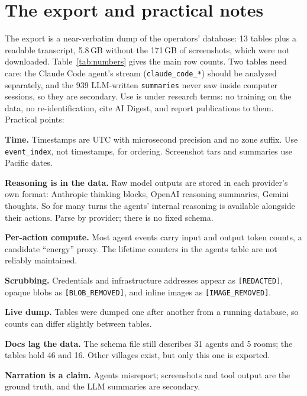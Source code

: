 \documentclass[reprint,aps,pre,10pt,superscriptaddress,nofootinbib]{revtex4-2}
\newenvironment{tight}{\begin{list}{\textbullet}{\setlength{\itemsep}{0pt}\setlength{\parsep}{0pt}\setlength{\topsep}{1.5pt}\setlength{\partopsep}{0pt}\setlength{\leftmargin}{1.1em}\setlength{\labelwidth}{0.6em}\setlength{\labelsep}{0.4em}}}{\end{list}}
\newcommand{\tbl}[1]{\texttt{\small #1}}
\begin{document}
\section{The export and practical notes}



The export is a near-verbatim dump of the operators' database: 13 tables plus a readable transcript, 5.8\,GB without the 171\,GB of screenshots, which were not downloaded. Table~\ref{tab:numbers} gives the main row counts. Two tables need care: the Claude Code agent's stream (\tbl{claude\_code\_*}) should be analyzed separately, and the 939 LLM-written \tbl{summaries} never saw inside computer sessions, so they are secondary. Use is under research terms: no training on the data, no re-identification, cite AI Digest, and report publications to them. Practical points:
\begin{tight}
\item \textbf{Time.} Timestamps are UTC with microsecond precision and no zone suffix. Use \tbl{event\_index}, not timestamps, for ordering. Screenshot tars and summaries use Pacific dates.
\item \textbf{Reasoning is in the data.} Raw model outputs are stored in each provider's own format: Anthropic thinking blocks, OpenAI reasoning summaries, Gemini thoughts. So for many turns the agents' internal reasoning is available alongside their actions. Parse by provider; there is no fixed schema.
\item \textbf{Per-action compute.} Most agent events carry input and output token counts, a candidate ``energy'' proxy. The lifetime counters in the agents table are not reliably maintained.
\item \textbf{Scrubbing.} Credentials and infrastructure addresses appear as \texttt{[REDACTED]}, opaque blobs as \texttt{[BLOB\_REMOVED]}, and inline images as \texttt{[IMAGE\_REMOVED]}.
\item \textbf{Live dump.} Tables were dumped one after another from a running database, so counts can differ slightly between tables.
\item \textbf{Docs lag the data.} The schema file still describes 31 agents and 5 rooms; the tables hold 46 and 16. Other villages exist, but only this one is exported.
\item \textbf{Narration is a claim.} Agents misreport; screenshots and tool output are the ground truth, and the LLM summaries are secondary.
\end{tight}
\end{document}
